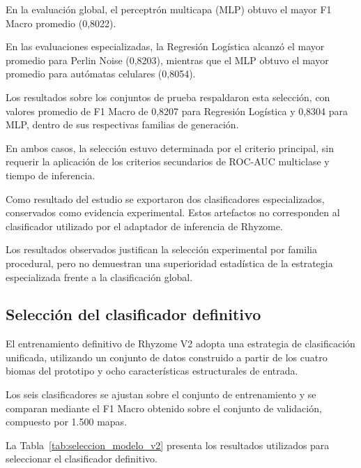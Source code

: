\FloatBarrier

En la evaluación global, el perceptrón multicapa (MLP) obtuvo el mayor F1 Macro promedio (0,8022).

En las evaluaciones especializadas, la Regresión Logística alcanzó el mayor promedio para Perlin Noise (0,8203), mientras que el MLP obtuvo el mayor promedio para autómatas celulares (0,8054).

Los resultados sobre los conjuntos de prueba respaldaron esta selección, con valores promedio de F1 Macro de 0,8207 para Regresión Logística y 0,8304 para MLP, dentro de sus respectivas familias de generación.

En ambos casos, la selección estuvo determinada por el criterio principal, sin requerir la aplicación de los criterios secundarios de ROC-AUC multiclase y tiempo de inferencia.

Como resultado del estudio se exportaron dos clasificadores especializados, conservados como evidencia experimental. Estos artefactos no corresponden al clasificador utilizado por el adaptador de inferencia de Rhyzome.

Los resultados observados justifican la selección experimental por familia procedural, pero no demuestran una superioridad estadística de la estrategia especializada frente a la clasificación global.


\subsection{Selección del clasificador definitivo}
\label{subsec:criterios_seleccion_ia}

El entrenamiento definitivo de Rhyzome V2 adopta una estrategia de clasificación unificada, utilizando un conjunto de datos construido a partir de los cuatro biomas del prototipo y ocho características estructurales de entrada.

Los seis clasificadores se ajustan sobre el conjunto de entrenamiento y se comparan mediante el F1 Macro obtenido sobre el conjunto de validación, compuesto por 1.500 mapas.

La Tabla~\ref{tab:seleccion_modelo_v2} presenta los resultados utilizados para seleccionar el clasificador definitivo.

